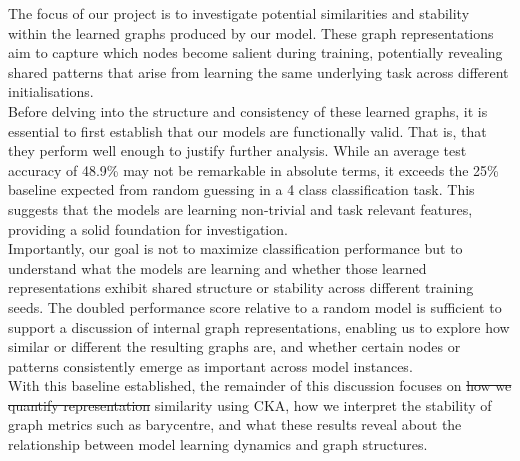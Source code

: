 The focus of our project is to investigate potential similarities and stability within the learned graphs produced by our model. These graph representations aim to capture which nodes become salient during training, potentially revealing shared patterns that arise from learning the same underlying task across different initialisations.
\vspace{0.5em}\\
Before delving into the structure and consistency of these learned graphs, it is essential to first establish that our models are functionally valid. That is, that they perform well enough to justify further analysis. While an average test accuracy of 48.9\% may not be remarkable in absolute terms, it exceeds the 25\% baseline expected from random guessing in a 4 class classification task. This suggests that the models are learning non-trivial and task relevant features, providing a solid foundation for investigation.
\vspace{0.5em}\\
Importantly, our goal is not to maximize classification performance but to understand what the models are learning and whether those learned representations exhibit shared structure or stability across different training seeds. The doubled performance score relative to a random model is sufficient to support a discussion of internal graph representations, enabling us to explore how similar or different the resulting graphs are, and whether certain nodes or patterns consistently emerge as important across model instances.
\vspace{0.5em}\\
With this baseline established, the remainder of this discussion focuses on \sout{how we quantify representation} similarity using CKA, how we interpret the stability of graph metrics such as barycentre, and what these results reveal about the relationship between model learning dynamics and graph structures.
